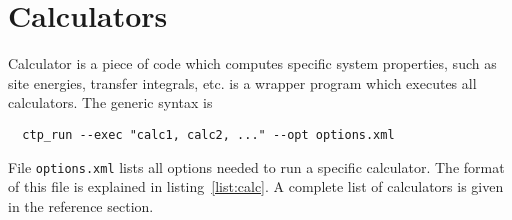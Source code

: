 \chapter{Calculators}
\label{sec:calculators}

Calculator is a piece of code which computes specific system properties, such as site energies, transfer integrals, etc. \ctprun is a wrapper program which executes all calculators. The generic syntax is 
\begin{verbatim}
  ctp_run --exec "calc1, calc2, ..." --opt options.xml
\end{verbatim}
%
File \texttt{options.xml} lists all options needed to run a specific calculator. The format of this file is explained in listing~\ref{list:calc}. A complete list of calculators is given in the  reference section.
%

